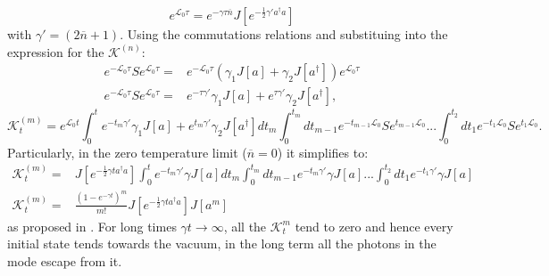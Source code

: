 \begin{equation}
  e^{\mathcal{L}_{0}\tau} = e^{-\gamma\tau\overline{n}}J[e^{-\frac{1}{2}\gamma'a^{\dagger}a}]
\end{equation}
with $\gamma' = (2\overline{n}+1)$. Using the commutations relations
and substituing into the expression for the $\mathcal{K}^{(n)}$:
\begin{align}
  e^{-\mathcal{L}_{0}\tau}Se^{\mathcal{L}_{0}\tau} =& e^{-\mathcal{L}_{0}\tau}\left(\gamma_{1}J[a]+\gamma_{2}J[a^{\dagger}] \right)e^{\mathcal{L}_{0}\tau}\\
 e^{-\mathcal{L}_{0}\tau}Se^{\mathcal{L}_{0}\tau} =& e^{-\tau\gamma'}\gamma_{1}J[a]+e^{\tau\gamma'}\gamma_{2}J[a^{\dagger}],
\end{align}
\begin{equation}
\mathcal{K}_{t}^{(m)}=e^{\mathcal{L}_{0}t}\int_{0}^{t}e^{-t_{m}\gamma'}\gamma_{1}J[a]+e^{t_{m}\gamma'}\gamma_{2}J[a^{\dagger}]dt_{m}\int_{0}^{t_{m}}dt_{m-1}e^{-t_{m-1}\mathcal{L}_{0}}Se^{t_{m-1}\mathcal{L}_{0}}...\int_{0}^{t_{2}}dt_{1}e^{-t_{1}\mathcal{L}_{0}}Se^{t_{1}\mathcal{L}_{0}}.
\end{equation}
Particularly, in the zero temperature limit ($\overline{n}=0$) it simplifies to:
\begin{align}
\mathcal{K}_{t}^{(m)}=&J[e^{-\frac{1}{2}\gamma t a^{\dagger}a}]\int_{0}^{t}e^{-t_{m}\gamma'}\gamma J[a]dt_{m}\int_{0}^{t_{m}}dt_{m-1}e^{-t_{m}\gamma'}\gamma J[a]...\int_{0}^{t_{2}}dt_{1}e^{-t_{1}\gamma'}\gamma J[a]\\
\mathcal{K}_{t}^{(m)}=& \frac{(1-e^{-\gamma t})^{m}}{m!}J[e^{-\frac{1}{2}\gamma t a^{\dagger}a}]J[a^{m}]
\end{align}
as proposed in \cite{wiseman_quantum_2010,adesso_optimal_2009}. For long times $\gamma t \to \infty$, all the $\mathcal{K}^{m}_{t}$ tend to zero
and hence every initial state tends towards the vacuum, in the long term all the photons in the mode escape from it.
